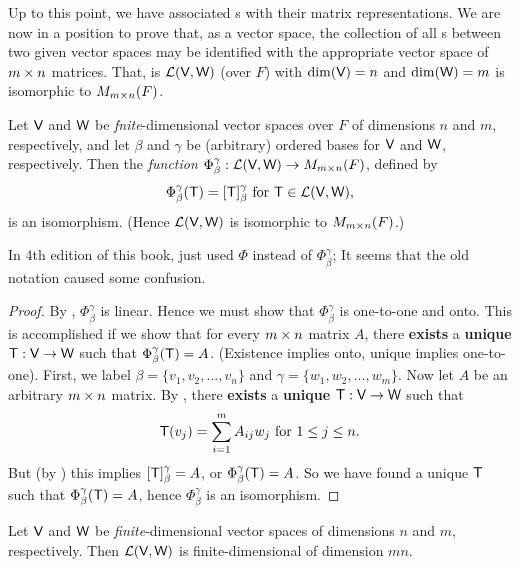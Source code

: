 Up to this point, we have associated \LTRAN{}s with their matrix representations.
We are now in a position to prove that, as a vector space, the collection of all \LTRAN{}s between two given vector
spaces may be identified with the appropriate vector space of \(m \times n\) matrices.
That, is \(\mathcal{L}(\textsf{V}, \textsf{W})\) (over \(F\)) with \(\dim(\textsf{V}) = n\) and \(\dim(\textsf{W}) = m\) is isomorphic to \(M_{m \times n}(F)\).

\begin{theorem} \label{thm 2.20}
Let \(\textsf{V}\) and \(\textsf{W}\) be \emph{fnite}-dimensional vector spaces over \(F\) of dimensions \(n\) and \(m\), respectively,
and let \(\beta\) and \(\gamma\) be (arbitrary) ordered bases for \(\textsf{V}\) and \(\textsf{W}\), respectively.
Then the \emph{function} \(\Phi_{\beta}^{\gamma}: \mathcal{L}(\textsf{V}, \textsf{W}) \to M_{m \times n}(F)\), defined by
\[
    \Phi_{\beta}^{\gamma}(\textsf{T}) = [\textsf{T}]_{\beta}^{\gamma} \text{ for } \textsf{T} \in \mathcal{L}(\textsf{V}, \textsf{W}),
\]
is an isomorphism.
(Hence \(\mathcal{L}(\textsf{V}, \textsf{W})\) is isomorphic to \(M_{m \times n}(F)\).)
\end{theorem}

\begin{note}
In 4th edition of this book,  just used \(\Phi\) instead of \(\Phi_{\beta}^{\gamma}\);
It seems that the old notation caused some confusion.
\end{note}

\begin{proof}
By , \(\Phi_{\beta}^{\gamma}\) is linear.
Hence we must show that \(\Phi_{\beta}^{\gamma}\) is one-to-one and onto.
This is accomplished if we show that for every \(m \times n\) matrix \(A\), there \textbf{exists} a \textbf{unique} \LTRAN{} \(\textsf{T} : \textsf{V} \to \textsf{W}\) such that \(\Phi_{\beta}^{\gamma}(\textsf{T}) = A\).
(Existence implies onto, unique implies one-to-one).
First, we label \(\beta = \{ v_1, v_2, ..., v_n \}\) and \(\gamma = \{ w_1, w_2, ..., w_m \}\).
Now let \(A\) be an arbitrary \(m \times n\) matrix.
By , there \textbf{exists} a \textbf{unique} \LTRAN{} \(\textsf{T}: \textsf{V} \to \textsf{W}\) such that
\[
    \textsf{T}(v_j) = \sum_{i = 1}^{m} A_{ij} w_j \text{ for } 1 \le j \le n.
\]
But (by ) this implies \([\textsf{T}]_{\beta}^{\gamma} = A\), or \(\Phi_{\beta}^{\gamma}(\textsf{T}) = A\).
So we have found a unique \(\textsf{T}\) such that \(\Phi_{\beta}^{\gamma}(\textsf{T}) = A\), hence \(\Phi_{\beta}^{\gamma}\) is an isomorphism.
\end{proof}

\begin{corollary} \label{corollary 2.20.1}
Let \(\textsf{V}\) and \(\textsf{W}\) be \emph{finite}-dimensional vector spaces of dimensions \(n\) and \(m\), respectively.
Then \(\mathcal{L}(\textsf{V}, \textsf{W})\) is finite-dimensional of dimension \(mn\).
\end{corollary}

